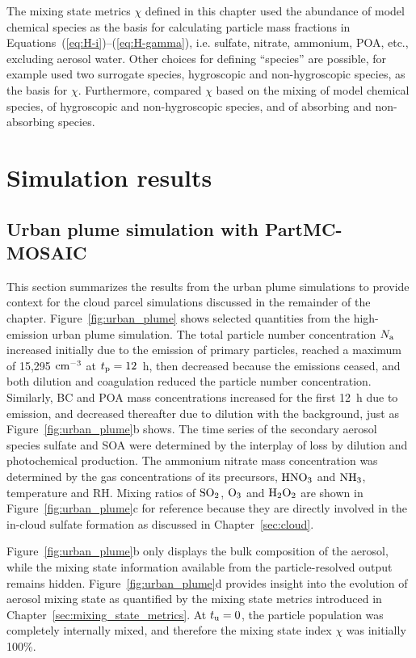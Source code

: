 \documentclass[edeposit,fullpage]{uiucthesis2009}
\begin{document}
The mixing state metrics $\chi$ defined in this chapter used the
abundance of model chemical species as the basis for calculating
particle mass fractions in
Equations~(\ref{eq:H-i})--(\ref{eq:H-gamma}), i.e. sulfate, nitrate,
ammonium, POA, etc., excluding aerosol water. Other choices for
defining ``species'' are possible, for example \citet{Ching2017} used
two surrogate species, hygroscopic and non-hygroscopic species, as the
basis for $\chi$. Furthermore, \citet{Zheng2021} compared $\chi$ based
on the mixing of model chemical species, of hygroscopic and
non-hygroscopic species, and of absorbing and non-absorbing species.

\section{Simulation results}
\label{sec:results}
\subsection{Urban plume simulation with PartMC-MOSAIC}
\label{sec:urban_plume}

This section summarizes the results from the urban plume simulations
to provide context for the cloud parcel simulations discussed in the
remainder of the chapter. Figure~\ref{fig:urban_plume} shows selected
quantities from the high-emission urban plume simulation. The
total particle number concentration $N_{\rm a}$ increased initially
due to the emission of primary particles, reached a maximum of 15,295
$\rm cm^{-3}$ at $t_{\rm p} = 12$~h, then decreased because the
emissions ceased, and both dilution and coagulation reduced the
particle number concentration. Similarly, BC and POA mass
concentrations increased for the first 12~h due to emission, and
decreased thereafter due to dilution with the background, just as
Figure~\ref{fig:urban_plume}b shows. The time series of the secondary
aerosol species sulfate and SOA were determined by the interplay of
loss by dilution and photochemical production. The ammonium nitrate
mass concentration was determined by the gas concentrations of its
precursors, $\rm HNO_3$ and $\rm NH_3$, temperature and RH. Mixing
ratios of $\rm SO_2$, $\rm O_3$ and $\rm H_2O_2$ are shown in
Figure~\ref{fig:urban_plume}c for reference because they are directly
involved in the in-cloud sulfate formation as discussed in
Chapter~\ref{sec:cloud}.

Figure~\ref{fig:urban_plume}b only displays the bulk composition of
the aerosol, while the mixing state information available from the
particle-resolved output remains hidden. Figure~\ref{fig:urban_plume}d
provides insight into the evolution of aerosol mixing state as
quantified by the mixing state metrics introduced in
Chapter~\ref{sec:mixing_state_metrics}. At $t_{\rm u} = 0$, the
particle population was completely internally mixed, and therefore the
mixing state index $\chi$ was initially 100\%.
\end{document}
